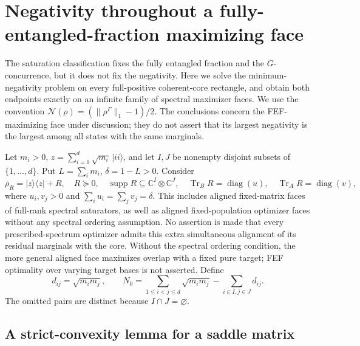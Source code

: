 \section{Negativity throughout a fully-entangled-fraction maximizing face}
\label{sec:negativity-face}

The saturation classification fixes the fully entangled fraction and the
$G$-concurrence, but it does not fix the negativity.  Here we solve the
minimum-negativity problem on every full-positive coherent-core rectangle,
and obtain both endpoints exactly on an infinite family of spectral
maximizer faces. We use the convention
$\mathcal N(\rho)=(\|\rho^\Gamma\|_1-1)/2$.
The conclusions concern the FEF-maximizing face under discussion; they do
not assert that its largest negativity is the largest among all states
with the same marginals.

Let $m_i>0$, $z=\sum_{i=1}^d\sqrt{m_i}\,|ii\rangle$, and let $I,J$ be
nonempty disjoint subsets of $\{1,\ldots,d\}$. Put
$L=\sum_i m_i$, $\delta=1-L>0$. Consider
\[
 \rho_R=|z\rangle\langle z|+R,
 \quad R\succeq0,\quad
 \operatorname{supp}R\subseteq\mathbb C^I\otimes\mathbb C^J,
 \quad \operatorname{Tr}_B R=\operatorname{diag}(u),\quad
 \operatorname{Tr}_A R=\operatorname{diag}(v),
\]
where $u_i,v_j>0$ and $\sum_i u_i=\sum_jv_j=\delta$.
This includes aligned fixed-matrix faces of full-rank spectral saturators,
as well as aligned fixed-population optimizer faces without any spectral
ordering assumption. No assertion is made that every prescribed-spectrum
optimizer admits this extra simultaneous alignment of its residual
marginals with the core. Without the spectral ordering condition, the
more general aligned face maximizes overlap with a fixed pure target;
FEF optimality over varying target bases is not asserted. Define
\[
 d_{ij}=\sqrt{m_i m_j},\qquad
 N_0=\sum_{1\le i<j\le d}\sqrt{m_i m_j}
                -\sum_{i\in I,j\in J}d_{ij}.
\]
The omitted pairs are distinct because $I\cap J=\varnothing$.

\subsection{A strict-convexity lemma for a saddle matrix}

